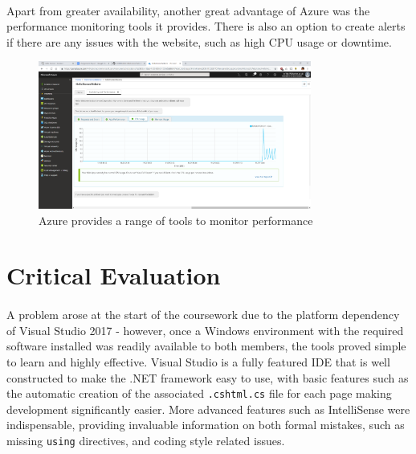 \documentclass{article}
\begin{document}
        \paragraph{}
            Apart from greater availability, another great advantage of Azure was the performance monitoring tools it provides.
            There is also an option to create alerts if there are any issues with the website, such as high CPU usage or downtime.

            \begin{figure}[!htb]
                \centering
                \includegraphics[width=0.8\textwidth]{figures/web_diagnostics.png}
                \caption[Performance Monitoring]{Azure provides a range of tools to monitor performance}
            \end{figure}

\FloatBarrier
\section{Critical Evaluation}
    \paragraph{}
        A problem arose at the start of the coursework due to the platform dependency of Visual Studio 2017 - however, once a Windows environment with the required software installed was readily available to both members, the tools proved simple to learn and highly effective.
        Visual Studio is a fully featured IDE that is well constructed to make the .NET framework easy to use, with basic features such as the automatic creation of the associated \texttt{.cshtml.cs} file for each page making development significantly easier.
        More advanced features such as IntelliSense were indispensable, providing invaluable information on both formal mistakes, such as missing \texttt{using} directives, and coding style related issues.
\end{document}
